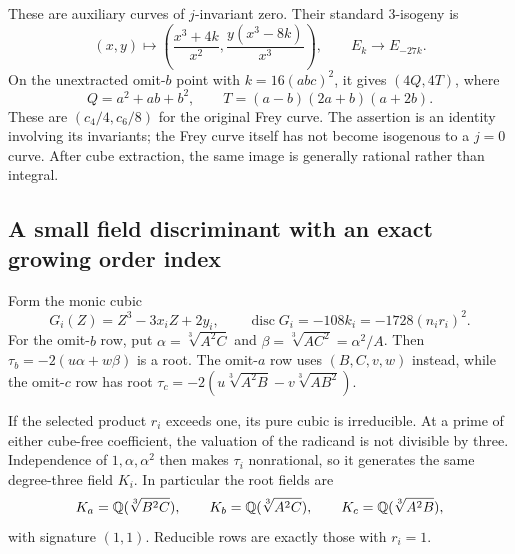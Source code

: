 These are auxiliary curves of $j$-invariant zero. Their standard
$3$-isogeny is
\begin{equation}\label{eq:auxiliary-three-isogeny}
 (x,y)\longmapsto
 \left(\frac{x^3+4k}{x^2},\frac{y(x^3-8k)}{x^3}\right),
 \qquad E_k\longrightarrow E_{-27k}.
\end{equation}
On the unextracted omit-$b$ point with $k=16(abc)^2$, it gives
$(4Q,4T)$, where
\[
 Q=a^2+ab+b^2,\qquad T=(a-b)(2a+b)(a+2b).
\]
These are $(c_4/4,c_6/8)$ for the original Frey curve.
The assertion is an identity involving its invariants; the Frey curve
itself has not become isogenous to a $j=0$ curve. After cube extraction,
the same image is generally rational rather than integral.

\subsection{A small field discriminant with an exact growing order index}

Form the monic cubic
\begin{equation}\label{eq:auxiliary-cubic}
 G_i(Z)=Z^3-3x_iZ+2y_i,
 \qquad \operatorname{disc}G_i=-108k_i=-1728(n_i r_i)^2.
\end{equation}
For the omit-$b$ row, put
$\alpha=\sqrt[3]{A^2C}$ and $\beta=\sqrt[3]{AC^2}=\alpha^2/A$.
Then $\tau_b=-2(u\alpha+w\beta)$ is a root. The omit-$a$ row uses
$(B,C,v,w)$ instead, while the omit-$c$ row has root
$\tau_c=-2(u\sqrt[3]{A^2B}-v\sqrt[3]{AB^2})$.

If the selected product $r_i$ exceeds one, its pure cubic is
irreducible. At a prime of either cube-free coefficient, the valuation
of the radicand is not divisible by three. Independence of
$1,\alpha,\alpha^2$ then makes $\tau_i$ nonrational, so it generates
the same degree-three field $K_i$. In particular the root fields are
\[
 K_a=\mathbb Q(\sqrt[3]{B^2C}),\qquad
 K_b=\mathbb Q(\sqrt[3]{A^2C}),\qquad
 K_c=\mathbb Q(\sqrt[3]{A^2B}),
\]
with signature $(1,1)$. Reducible rows are exactly those with $r_i=1$.

